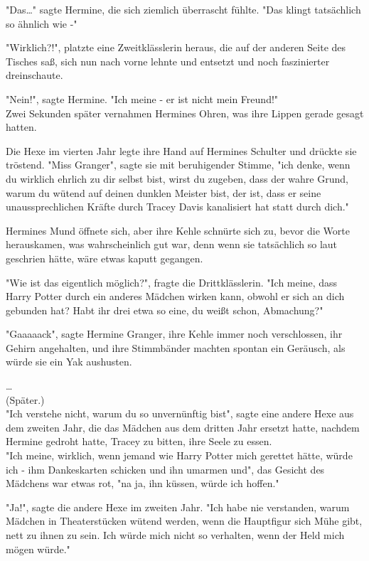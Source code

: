 {"Das…" sagte Hermine, die sich ziemlich überrascht fühlte. "Das klingt tatsächlich so ähnlich wie -"

"Wirklich?!", platzte eine Zweitklässlerin heraus, die auf der anderen Seite des Tisches saß, sich nun nach vorne lehnte und entsetzt und noch faszinierter dreinschaute.

"Nein!", sagte Hermine. "Ich meine - er ist nicht mein Freund!"\\ Zwei Sekunden später vernahmen Hermines Ohren, was ihre Lippen gerade gesagt\\ hatten.

Die Hexe im vierten Jahr legte ihre Hand auf Hermines Schulter und drückte sie tröstend. "Miss Granger", sagte sie mit beruhigender Stimme, "ich denke, wenn du wirklich ehrlich zu dir selbst bist, wirst du zugeben, dass der wahre Grund, warum du wütend auf deinen dunklen Meister bist, der ist, dass er seine unaussprechlichen Kräfte durch Tracey Davis kanalisiert hat statt durch dich."

Hermines Mund öffnete sich, aber ihre Kehle schnürte sich zu, bevor die Worte herauskamen, was wahrscheinlich gut war, denn wenn sie tatsächlich so laut geschrien hätte, wäre etwas kaputt gegangen.

"Wie ist das eigentlich möglich?", fragte die Drittklässlerin. "Ich meine, dass Harry Potter durch ein anderes Mädchen wirken kann, obwohl er sich an dich gebunden hat? Habt ihr drei etwa so eine, du weißt schon, Abmachung?"

"Gaaaaack", sagte Hermine Granger, ihre Kehle immer noch verschlossen, ihr Gehirn angehalten, und ihre Stimmbänder machten spontan ein Geräusch, als würde sie ein Yak aushusten.

…\\ (Später.)\\ "Ich verstehe nicht, warum du so unvernünftig bist", sagte eine andere Hexe aus dem zweiten Jahr, die das Mädchen aus dem dritten Jahr ersetzt hatte, nachdem Hermine gedroht hatte, Tracey zu bitten, ihre Seele zu essen.\\ "Ich meine, wirklich, wenn jemand wie Harry Potter mich gerettet hätte, würde ich - ihm Dankeskarten schicken und ihn umarmen und", das Gesicht des Mädchens war etwas rot, "na ja, ihn küssen, würde ich hoffen."

"Ja!", sagte die andere Hexe im zweiten Jahr. "Ich habe nie verstanden, warum Mädchen in Theaterstücken wütend werden, wenn die Hauptfigur sich Mühe gibt, nett zu ihnen zu sein. Ich würde mich nicht so verhalten, wenn der Held mich mögen würde."

}
